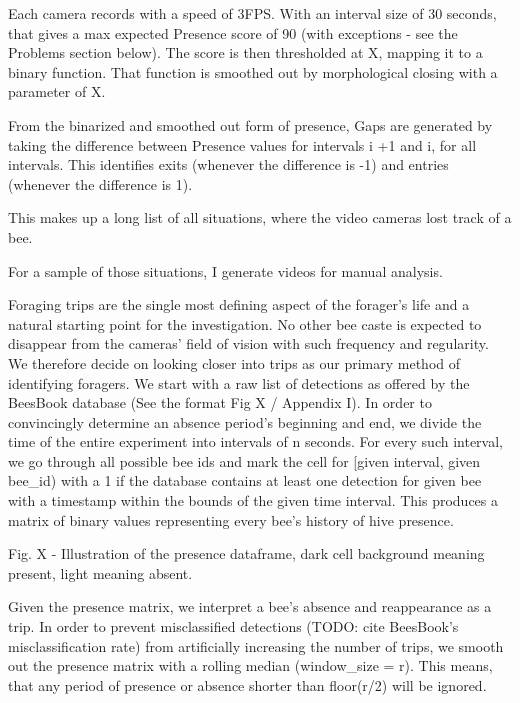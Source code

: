
Each camera records with a speed of 3FPS. With an interval size of 30 seconds,
that gives a max expected Presence score of 90 (with exceptions - see the Problems section below).
The score is then thresholded at X,
mapping it to a binary function. That function is smoothed out by morphological
closing with a parameter of X. 




From the binarized and smoothed out form of presence, Gaps are generated by
taking the difference between Presence values for intervals i +1 and i, for all
intervals. This identifies exits (whenever the difference is -1) and entries
(whenever the difference is 1). 

This makes up a long list of all situations, where the video cameras lost track
of a bee. 

For a sample of those situations, I generate videos for manual analysis. 

Foraging trips are the single most defining aspect of the forager’s life and a
natural starting point for the investigation. No other bee caste is expected to
disappear from the cameras’ field of vision with such frequency and regularity.
We therefore decide on looking closer into trips as our primary method of
identifying foragers. We start with a raw list of detections as offered by the
BeesBook database (See the format Fig X / Appendix I). In order to convincingly
determine an absence period’s beginning and end, we divide the time of the
entire experiment into intervals of n seconds. For every such interval, we go
through all possible bee ids and mark the cell for [given interval, given
bee\_id) with a 1 if the database contains at least one detection for given bee
with a timestamp within the bounds of the given time interval. This produces a
matrix of binary values representing every bee’s history of hive presence.



Fig. X - Illustration of the presence dataframe, dark cell background meaning
present, light meaning absent. 


Given the presence matrix, we interpret a bee’s absence and reappearance as a
trip. In order to prevent misclassified detections (TODO: cite BeesBook’s
misclassification rate)  from artificially increasing the number of trips, we
smooth out the presence matrix with a rolling median (window\_size = r). This
means, that any period of presence or absence shorter than floor(r/2) will be
ignored.


